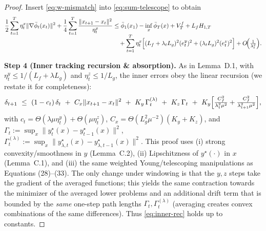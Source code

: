 \documentclass{uai2026} %
\begin{document}
\begin{proof}
Insert \eqref{eq:w-mismatch} into \eqref{eq:sum-telescope} to obtain
\begin{align}
\frac{1}{2}\sum_{t=1}^T\eta^x_t\|\nabla\bar\phi_t(x_t)\|^2+\frac{1}{4}\sum_{t=1}^T\frac{\|x_{t+1}-x_t\|^2}{\eta^x_t}
&\le \bar\phi_1(x_1)-\inf_x\bar\phi_T(x)+V_T^{f}+L_{f}H_{1,T}
\nonumber\\[-2mm]
&\quad+\sum_{t=1}^T\eta^x_t\Bigl[(L_f+\lambda_{t} L_g)^2(e^y_t)^2+(\lambda_{t} L_g)^2(e^z_t)^2\Bigr]
+O\!\Bigl(\tfrac{1}{\lambda_{t}^2}\Bigr).
\label{eq:pre-absorb}
\end{align}

\smallskip
\textbf{Step 4 (Inner tracking recursion \& absorption).}
As in Lemma~D.1, with $\eta^y_t\le 1/(L_f+\lambda L_g)$ and $\eta^z_t\le 1/L_g$, the inner errors obey the linear recursion (we restate it for completeness):
\begin{equation}
\delta_{t+1}\ \le\ (1-c_t)\,\delta_t\ +\ C_x\|x_{t+1}-x_t\|^2\ +\ K_y\,\Gamma^{(\lambda)}_t\ +\ K_z\,\Gamma_t\ +\ K_y\Bigl[\tfrac{C_f^2}{\lambda_t^2\mu^2}+\tfrac{C_f^2}{\lambda_{t+1}^2\mu^2}\Bigr],
\label{eq:inner-rec}
\end{equation}
with $c_t=\Theta(\lambda\mu\eta^y_t)+\Theta(\mu\eta^z_t)$, $C_x=\Theta(L_g^2\mu^{-2})(K_y+K_z)$, and $\Gamma_t:=\sup_x\|y^\star_t(x)-y^\star_{t-1}(x)\|^2$, $\Gamma^{(\lambda)}_t:=\sup_x\|y^\star_{\lambda,t}(x)-y^\star_{\lambda,t-1}(x)\|^2$. 
This proof uses (i) strong convexity/smoothness in $y$ (Lemma~C.2), (ii) Lipschitzness of $y^\star(\cdot)$ in $x$ (Lemma~C.1), and (iii) the same weighted Young/telescoping manipulations as Equations (28)–(33). 
The only change under windowing is that the $y,z$ steps take the gradient of the averaged functions; this yields the same contraction towards the minimizer of the averaged lower problems and an additional drift term that is bounded by the \emph{same} one-step path lengths $\Gamma_t,\Gamma^{(\lambda)}_t$ (averaging creates convex combinations of the same differences). Thus \eqref{eq:inner-rec} holds up to constants.


\end{proof}
\end{document}
